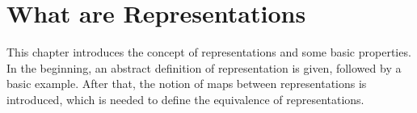 \section{What are Representations}

This chapter introduces the concept of representations and some basic properties.
In the beginning, an abstract definition of representation is given, followed by a basic example.
After that, the notion of maps between representations is introduced, which is needed to define the equivalence of representations.


